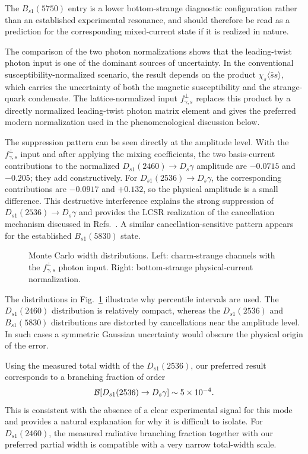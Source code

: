 \documentclass[aps,prd,preprint,nofootinbib,superscriptaddress]{revtex4-2}
\newcommand{\Ds}{D_s}
\newcommand{\Dsone}{D_{s1}}
\newcommand{\Bsone}{B_{s1}}
\begin{document}
The \(\Bsone(5750)\) entry is a lower bottom-strange diagnostic configuration
rather than an established experimental resonance, and should therefore be
read as a prediction for the corresponding mixed-current state if it is
realized in nature.

The comparison of the two photon normalizations shows that the leading-twist
photon input is one of the dominant sources of uncertainty.  In the
conventional susceptibility-normalized scenario, the result depends on the
product $\chi_s\langle\bar s s\rangle$, which carries the uncertainty of both
the magnetic susceptibility and the strange-quark condensate.  The
lattice-normalized input $f_{\gamma,s}^{\perp}$ replaces this product by a
directly normalized leading-twist photon matrix element and gives the preferred
modern normalization used in the phenomenological discussion below.

The suppression pattern can be seen directly at the amplitude level.  With the
$f_{\gamma,s}^{\perp}$ input and after applying the mixing coefficients, the
two basis-current contributions to the normalized
$\Dsone(2460)\to\Ds\gamma$ amplitude are $-0.0715$ and $-0.205$; they add
constructively.  For $\Dsone(2536)\to\Ds\gamma$, the corresponding
contributions are $-0.0917$ and $+0.132$, so the physical amplitude is a small
difference.  This destructive interference explains the strong suppression of
$\Dsone(2536)\to\Ds\gamma$ and provides the LCSR realization of the
cancellation mechanism discussed in Refs.~\cite{Bondar:2023mua,Bondar:2025smw}.
A similar cancellation-sensitive pattern appears for the established
$\Bsone(5830)$ state.

\begin{figure}[t]
\centering
\caption{Monte Carlo width distributions.  Left: charm-strange channels with
the $f_{\gamma,s}^{\perp}$ photon input.  Right: bottom-strange
physical-current normalization.}
\label{fig:mc}
\end{figure}

The distributions in Fig.~\ref{fig:mc} illustrate why percentile intervals are
used.  The $\Dsone(2460)$ distribution is relatively compact, whereas the
$\Dsone(2536)$ and $\Bsone(5830)$ distributions are distorted by cancellations
near the amplitude level.  In such cases a symmetric Gaussian uncertainty would
obscure the physical origin of the error.

Using the measured total width of the $\Dsone(2536)$, our preferred result
corresponds to a branching fraction of order
\begin{equation}
  {\cal B}[\Dsone(2536)\to\Ds\gamma]
  \sim 5\times10^{-4}.
  \label{eq:br-ds12536}
\end{equation}
This is consistent with the absence of a clear experimental signal for this
mode and provides a natural explanation for why it is difficult to isolate.
For $\Dsone(2460)$, the measured radiative branching fraction together with our
preferred partial width is compatible with a very narrow total-width scale.
\end{document}
